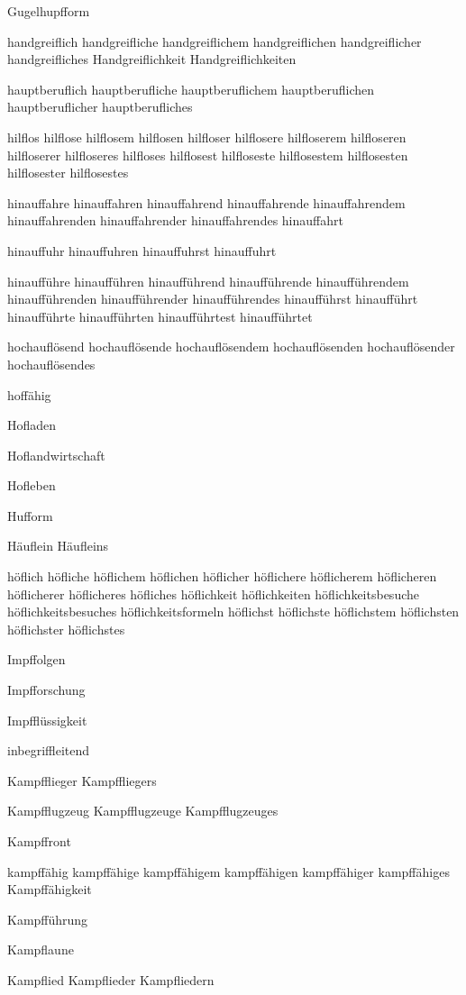 Gugelhupfform

handgreiflich handgreifliche handgreiflichem handgreiflichen handgreiflicher handgreifliches Handgreiflichkeit Handgreiflichkeiten

hauptberuflich hauptberufliche hauptberuflichem hauptberuflichen hauptberuflicher hauptberufliches

hilflos hilflose hilflosem hilflosen hilfloser hilflosere hilfloserem hilfloseren hilfloserer hilfloseres hilfloses hilflosest hilfloseste hilflosestem hilflosesten hilflosester hilflosestes

hinauffahre hinauffahren hinauffahrend hinauffahrende hinauffahrendem hinauffahrenden hinauffahrender hinauffahrendes hinauffahrt

hinauffuhr hinauffuhren hinauffuhrst hinauffuhrt

hinaufführe hinaufführen hinaufführend hinaufführende hinaufführendem hinaufführenden hinaufführender hinaufführendes hinaufführst hinaufführt hinaufführte hinaufführten hinaufführtest hinaufführtet

hochauflösend hochauflösende hochauflösendem hochauflösenden hochauflösender hochauflösendes

hoffähig

Hofladen

Hoflandwirtschaft

Hofleben

Hufform

Häuflein Häufleins

höflich höfliche höflichem höflichen höflicher höflichere höflicherem höflicheren höflicherer höflicheres höfliches höflichkeit höflichkeiten höflichkeitsbesuche höflichkeitsbesuches höflichkeitsformeln höflichst höflichste höflichstem höflichsten höflichster höflichstes

Impffolgen

Impfforschung

Impfflüssigkeit

inbegriffleitend 

Kampfflieger Kampffliegers

Kampfflugzeug Kampfflugzeuge Kampfflugzeuges

Kampffront

kampffähig kampffähige kampffähigem kampffähigen kampffähiger kampffähiges Kampffähigkeit

Kampfführung

Kampflaune

Kampflied Kampflieder Kampfliedern


